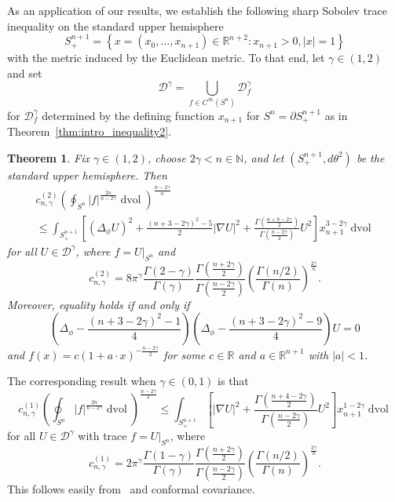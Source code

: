 \documentclass{amsart}
\newtheorem{thm}{Theorem}[section]
\theoremstyle{definition}
\theoremstyle{remark}
\numberwithin{equation}{section}
\begin{document}
As an application of our results, we establish the following sharp Sobolev trace inequality on the standard upper hemisphere
\[ S_+^{n+1} = \left\{ x=(x_0,\dotsc, x_{n+1})\in{\mathbb{R}}^{n+2} \colon x_{n+1}>0, {\lvert} x{\rvert}=1 \right\} \]
with the metric induced by the Euclidean metric.  To that end, let $\gamma\in(1,2)$ and set
\[ {\mathcal{D}}^\gamma = \bigcup_{f\in C^\infty(S^n)} {\mathcal{D}}_f^\gamma \]
for ${\mathcal{D}}_f^\gamma$ determined by the defining function $x_{n+1}$ for $S^n=\partial S_+^{n+1}$ as in Theorem~\ref{thm:intro_inequality2}.

\begin{thm}
 \label{thm:sobolev}
 Fix $\gamma\in(1,2)$, choose $2\gamma<n\in{\mathbb{N}}$, and let $(S_+^{n+1},d\theta^2)$ be the standard upper hemisphere.  Then
 \begin{multline}
  \label{eqn:sobolev}
  c_{n,\gamma}^{(2)}\left(\oint_{S^n} {\lvert} f{\rvert}^{\frac{2n}{n-2\gamma}}\operatorname{dvol}\right)^{\frac{n-2\gamma}{n}} \\ \leq \int_{S_+^{n+1}} \left[ \left(\Delta_\phi U\right)^2 + \frac{(n+3-2\gamma)^2-5}{2}{\lvert}\nabla U{\rvert}^2 + \frac{\Gamma\left(\frac{n+8-2\gamma}{2}\right)}{\Gamma\left(\frac{n-2\gamma}{2}\right)}U^2 \right] x_{n+1}^{3-2\gamma}\operatorname{dvol}
 \end{multline}
 for all $U\in{\mathcal{D}}^\gamma$, where $f=U{\rvert}_{S^n}$ and
 \[ c_{n,\gamma}^{(2)} = 8\pi^\gamma\frac{\Gamma(2-\gamma)}{\Gamma(\gamma)}\frac{\Gamma\left(\frac{n+2\gamma}{2}\right)}{\Gamma\left(\frac{n-2\gamma}{2}\right)}\left(\frac{\Gamma(n/2)}{\Gamma(n)}\right)^{\frac{2\gamma}{n}} . \]
 Moreover, equality holds if and only if
 \begin{equation}
  \label{eqn:paneitz_sobolev}
  \left(\Delta_\phi - \frac{(n+3-2\gamma)^2-1}{4}\right)\left(\Delta_\phi - \frac{(n+3-2\gamma)^2-9}{4}\right)U = 0
 \end{equation}
 and $f(x) = c\left(1+a\cdot x\right)^{-\frac{n-2\gamma}{2}}$ for some $c\in{\mathbb{R}}$ and $a\in{\mathbb{R}}^{n+1}$ with ${\lvert} a{\rvert}<1$.
\end{thm}

The corresponding result when $\gamma\in(0,1)$ is that
\[ c_{n,\gamma}^{(1)}\left(\oint_{S^n} {\lvert} f{\rvert}^{\frac{2n}{n-2\gamma}}\operatorname{dvol}\right)^{\frac{n-2\gamma}{2}} \leq \int_{S_+^{n+1}}\left[{\lvert}\nabla U{\rvert}^2 + \frac{\Gamma\left(\frac{n+4-2\gamma}{2}\right)}{\Gamma\left(\frac{n-2\gamma}{2}\right)}U^2\right]x_{n+1}^{1-2\gamma}\operatorname{dvol} \]
for all $U\in{\mathcal{D}}^\gamma$ with trace $f=U{\rvert}_{S^n}$, where
\[ c_{n,\gamma}^{(1)} = 2\pi^\gamma\frac{\Gamma(1-\gamma)}{\Gamma(\gamma)}\frac{\Gamma\left(\frac{n+2\gamma}{2}\right)}{\Gamma\left(\frac{n-2\gamma}{2}\right)}\left(\frac{\Gamma(n/2)}{\Gamma(n)}\right)^{\frac{2\gamma}{n}} . \]
This follows easily from~\cite[Corollary~5.3]{GonzalezQing2010} and conformal covariance.
\end{document}
